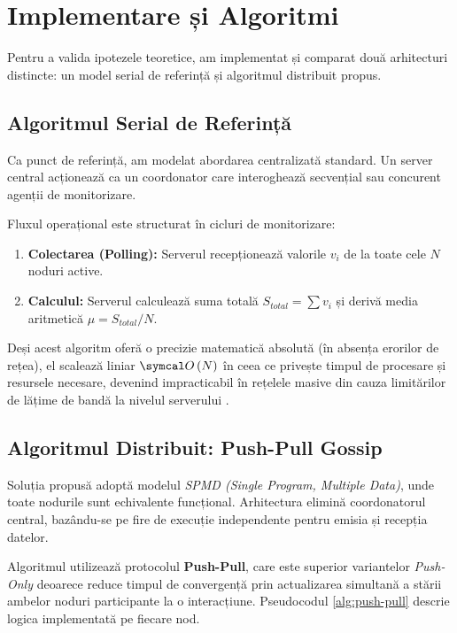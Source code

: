 \section{Implementare și Algoritmi}
\label{sec:algorithms}

Pentru a valida ipotezele teoretice, am implementat și comparat două arhitecturi distincte: un model serial de referință și algoritmul distribuit propus.

\subsection{Algoritmul Serial de Referință}
Ca punct de referință, am modelat abordarea centralizată standard. Un server central acționează ca un coordonator care interoghează secvențial sau concurent agenții de monitorizare.

Fluxul operațional este structurat în cicluri de monitorizare:
\begin{enumerate}
    \item \textbf{Colectarea (Polling):} Serverul recepționează valorile $v_i$ de la toate cele $N$ noduri active.
    \item \textbf{Calculul:} Serverul calculează suma totală $S_{total} = \sum v_i$ și derivă media aritmetică $\mu = S_{total} / N$.
\end{enumerate}

Deși acest algoritm oferă o precizie matematică absolută (în absența erorilor de rețea), el scalează liniar $\bigO{N}$ în ceea ce privește timpul de procesare și resursele necesare, devenind impracticabil în rețelele masive din cauza limitărilor de lățime de bandă la nivelul serverului \cite{van2017distributed}.

\subsection{Algoritmul Distribuit: Push-Pull Gossip}
Soluția propusă adoptă modelul \textit{SPMD (Single Program, Multiple Data)}, unde toate nodurile sunt echivalente funcțional. Arhitectura elimină coordonatorul central, bazându-se pe fire de execuție independente pentru emisia și recepția datelor.

Algoritmul utilizează protocolul \textbf{Push-Pull}, care este superior variantelor \textit{Push-Only} deoarece reduce timpul de convergență prin actualizarea simultană a stării ambelor noduri participante la o interacțiune. Pseudocodul \ref{alg:push-pull} descrie logica implementată pe fiecare nod.

